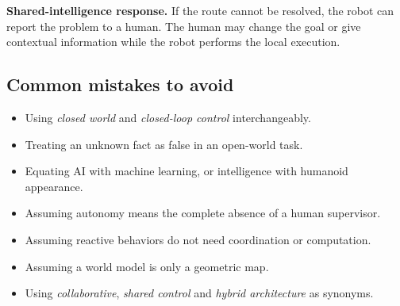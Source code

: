 \textbf{Shared-intelligence response.} If the route cannot be resolved, the robot can report the problem to a human. The human may change the goal or give contextual information while the robot performs the local execution.

\subsection{Common mistakes to avoid}
\begin{itemize}
\item Using \emph{closed world} and \emph{closed-loop control} interchangeably.
\item Treating an unknown fact as false in an open-world task.
\item Equating AI with machine learning, or intelligence with humanoid appearance.
\item Assuming autonomy means the complete absence of a human supervisor.
\item Assuming reactive behaviors do not need coordination or computation.
\item Assuming a world model is only a geometric map.
\item Using \emph{collaborative}, \emph{shared control} and \emph{hybrid architecture} as synonyms.
\end{itemize}
